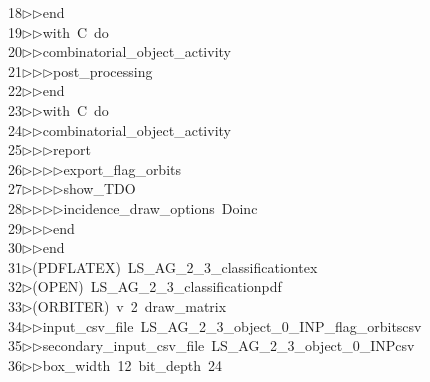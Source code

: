 \begin{tabbing}
18\>$\triangleright$\>$\triangleright$\>end\ \\[0pt]
19\>$\triangleright$\>$\triangleright$\>with\ C\ do\ \\[0pt]
20\>$\triangleright$\>$\triangleright$\>combinatorial\_object\_activity\ \\[0pt]
21\>$\triangleright$\>$\triangleright$\>$\triangleright$\>post\_processing\ \\[0pt]
22\>$\triangleright$\>$\triangleright$\>end\ \\[0pt]
23\>$\triangleright$\>$\triangleright$\>with\ C\ do\ \\[0pt]
24\>$\triangleright$\>$\triangleright$\>combinatorial\_object\_activity\ \\[0pt]
25\>$\triangleright$\>$\triangleright$\>$\triangleright$\>report\ \\[0pt]
26\>$\triangleright$\>$\triangleright$\>$\triangleright$\>$\triangleright$\>export\_flag\_orbits\ \\[0pt]
27\>$\triangleright$\>$\triangleright$\>$\triangleright$\>$\triangleright$\>show\_TDO\ \\[0pt]
28\>$\triangleright$\>$\triangleright$\>$\triangleright$\>$\triangleright$\>incidence\_draw\_options\ Doinc\ \\[0pt]
29\>$\triangleright$\>$\triangleright$\>$\triangleright$\>end\ \\[0pt]
30\>$\triangleright$\>$\triangleright$\>end\\[0pt]
31\>$\triangleright$\>(PDFLATEX)\ LS\_AG\_2\_3\_classificationtex\\[0pt]
32\>$\triangleright$\>(OPEN)\ LS\_AG\_2\_3\_classificationpdf\\[0pt]
33\>$\triangleright$\>(ORBITER)\ v\ 2\ draw\_matrix\ \\[0pt]
34\>$\triangleright$\>$\triangleright$\>input\_csv\_file\ LS\_AG\_2\_3\_object\_0\_INP\_flag\_orbitscsv\ \\[0pt]
35\>$\triangleright$\>$\triangleright$\>secondary\_input\_csv\_file\ LS\_AG\_2\_3\_object\_0\_INPcsv\ \\[0pt]
36\>$\triangleright$\>$\triangleright$\>box\_width\ 12\ bit\_depth\ 24\ \\[0pt]

\end{tabbing}
